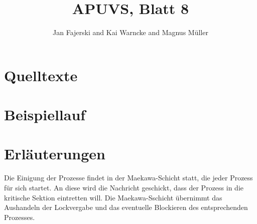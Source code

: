 \documentclass[a4paper,
12pt,
BCOR12mm,
]{scrartcl}
\title{APUVS, Blatt 8}
\author{Jan Fajerski and Kai Warncke and Magnus Müller}
\theoremstyle{break}
\begin{document}

\maketitle 

\section*{Quelltexte}
  
  
  
  

\section*{Beispiellauf}

\section*{Erläuterungen}
 Die Einigung der Prozesse findet in der Maekawa-Schicht statt, die jeder
 Prozess für sich startet. An diese wird die Nachricht geschickt, dass der
 Prozess in die kritische Sektion eintretten will. Die Maekawa-Sschicht
 übernimmt das Aushandeln der Lockvergabe und das eventuelle Blockieren des
 entsprechenden Prozesses.
 
\end{document}
